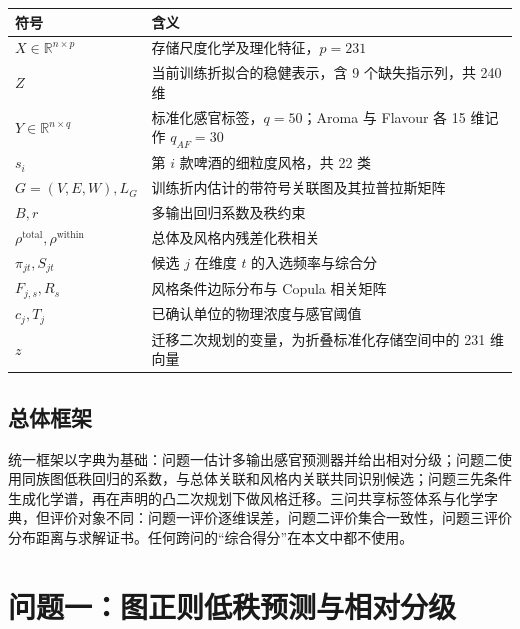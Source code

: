 \documentclass[11pt,a4paper]{article}
\begin{document}
{
\begin{longtable}[]{@{}
  >{\raggedright\arraybackslash}p{}
  >{\raggedright\arraybackslash}p{}@{}}
\toprule\noalign{}
\begin{minipage}[b]{\linewidth}\raggedright
符号
\end{minipage} & \begin{minipage}[b]{\linewidth}\raggedright
含义
\end{minipage} \\
\midrule\noalign{}
\endhead
\bottomrule\noalign{}
\endlastfoot
\(X\in\mathbb R^{n\times p}\) & 存储尺度化学及理化特征，\(p=231\) \\
\(Z\) & 当前训练折拟合的稳健表示，含 9 个缺失指示列，共 240 维 \\
\(Y\in\mathbb R^{n\times q}\) & 标准化感官标签，\(q=50\)；Aroma 与
Flavour 各 15 维记作 \(q_{AF}=30\) \\
\(s_i\) & 第 \(i\) 款啤酒的细粒度风格，共 22 类 \\
\(G=(V,E,W),L_G\) & 训练折内估计的带符号关联图及其拉普拉斯矩阵 \\
\(B,r\) & 多输出回归系数及秩约束 \\
\(\rho^{\mathrm{total}},\rho^{\mathrm{within}}\) &
总体及风格内残差化秩相关 \\
\(\pi_{jt},S_{jt}\) & 候选 \(j\) 在维度 \(t\) 的入选频率与综合分 \\
\(F_{j,s},R_s\) & 风格条件边际分布与 Copula 相关矩阵 \\
\(c_j,T_j\) & 已确认单位的物理浓度与感官阈值 \\
\(z\) & 迁移二次规划的变量，为折叠标准化存储空间中的 231 维向量 \\
\end{longtable}
}

\subsection{总体框架}\label{ux603bux4f53ux6846ux67b6}

统一框架以字典为基础：问题一估计多输出感官预测器并给出相对分级；问题二使用同族图低秩回归的系数，与总体关联和风格内关联共同识别候选；问题三先条件生成化学谱，再在声明的凸二次规划下做风格迁移。三问共享标签体系与化学字典，但评价对象不同：问题一评价逐维误差，问题二评价集合一致性，问题三评价分布距离与求解证书。任何跨问的``综合得分''在本文中都不使用。

\section{问题一：图正则低秩预测与相对分级}\label{ux95eeux9898ux4e00ux56feux6b63ux5219ux4f4eux79e9ux9884ux6d4bux4e0eux76f8ux5bf9ux5206ux7ea7}
\end{document}

